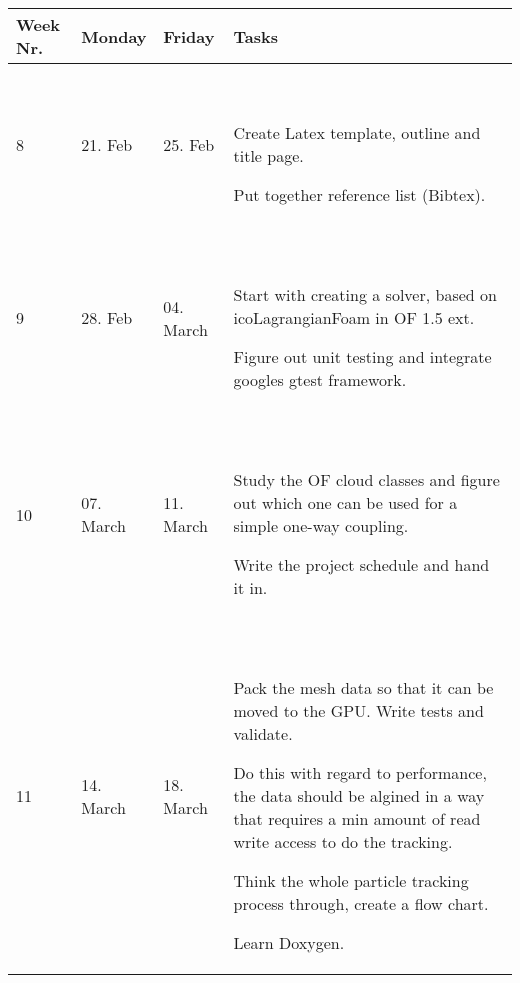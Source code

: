 \documentclass[
  a4wide,
  smallheadings
]{article}
\begin{document}
    

\begin{supertabular}{|p{1.5cm}|p{2cm}|p{2cm}|p{8cm}|}
    
    \hline 
    Week Nr. & Monday & Friday & Tasks \\
    
    \hline \hline
    
    8 & 21. Feb & 25. Feb &
    \begin{compactitem}
      \item Create Latex template, outline and title page. 
      \item Put together reference list (Bibtex).
    \end{compactitem}\\
    
    \hline
    
    9 & 28. Feb & 04. March &
    \begin{compactitem}
        \item Start with creating a solver, based on icoLagrangianFoam in OF 1.5 ext.
        \item Figure out unit testing and integrate googles gtest framework.
    \end{compactitem}\\

    \hline

    10 & 07. March & 11. March &
    
    \begin{compactitem}
        \item Study the OF cloud classes and figure out which one can be used for
              a simple one-way coupling.
        \item Write the project schedule and hand it in.
    \end{compactitem} \\

    \hline

    11 & 14. March & 18. March &
    
     \begin{compactitem}
        \item Pack the mesh data so that it can be moved to the GPU. Write tests
              and validate.
        \item Do this with regard to performance, the data should be algined in
              a way that requires a min amount of read write access to do the
              tracking.
        \item Think the whole particle tracking process through, create a flow
              chart.
        \item Learn Doxygen.
    \end{compactitem} \\


\end{supertabular}
\end{document}
